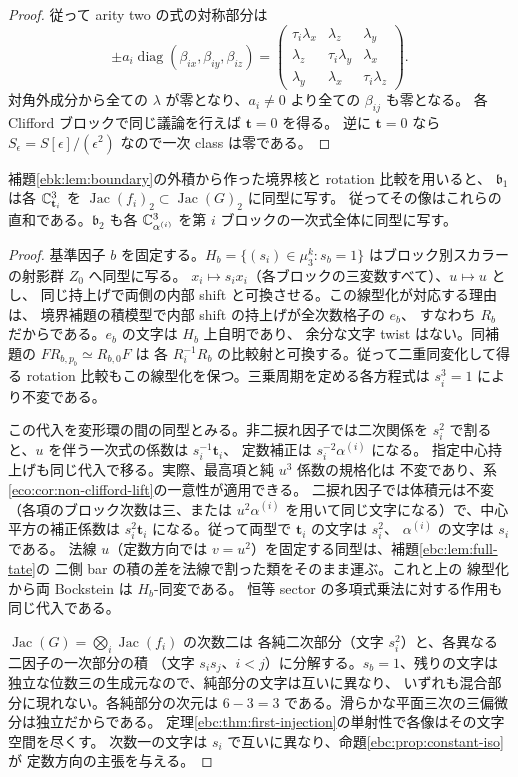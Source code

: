 \begin{proof}
従って arity two の式の対称部分は
\[
 \pm a_i\operatorname{diag}(\beta_{ix},\beta_{iy},\beta_{iz})
   =
 \begin{pmatrix}
 \tau_i\lambda_x&\lambda_z&\lambda_y\\
 \lambda_z&\tau_i\lambda_y&\lambda_x\\
 \lambda_y&\lambda_x&\tau_i\lambda_z
 \end{pmatrix}.
\]
対角外成分から全ての $\lambda$ が零となり、$a_i\ne0$ より全ての $\beta_{ij}$ も零となる。
各 Clifford ブロックで同じ議論を行えば $\mathbf t=0$ を得る。
逆に $\mathbf t=0$ なら $S_\epsilon=S[\epsilon]/(\epsilon^2)$ なので一次 class は零である。
\end{proof}

\begin{corollary}[固定楕円因子ごとの一次像]\label{ebc:cor:pure-image}
補題\ref{ebk:lem:boundary}の外積から作った境界核と rotation 比較を用いると、
$\mathfrak b_1$ は各 $\mathbb C^3_{\mathbf t_i}$ を
$\operatorname{Jac}(f_i)_2\subset\operatorname{Jac}(G)_2$ に同型に写す。
従ってその像はこれらの直和である。$\mathfrak b_2$ も各
$\mathbb C^3_{\alpha^{(i)}}$ を第 $i$ ブロックの一次式全体に同型に写す。
\end{corollary}
\begin{proof}
基準因子 $b$ を固定する。$H_b=\{(s_i)\in\mu_3^k:s_b=1\}$
はブロック別スカラーの射影群 $Z_0$ へ同型に写る。
$x_i\mapsto s_i x_i$（各ブロックの三変数すべて）、$u\mapsto u$ とし、
同じ持上げで両側の内部 shift と可換させる。この線型化が対応する理由は、
境界補題の積模型で内部 shift の持上げが全次数格子の $e_b$、
すなわち $R_b$ だからである。$e_b$ の文字は $H_b$ 上自明であり、
余分な文字 twist はない。同補題の $FR_{b,p_b}\simeq R_{b,0}F$ は
各 $R_i^{-1}R_b$ の比較射と可換する。従って二重同変化して得る
rotation 比較もこの線型化を保つ。三乗周期を定める各方程式は $s_i^3=1$ により不変である。

この代入を変形環の間の同型とみる。非二捩れ因子では二次関係を
$s_i^2$ で割ると、$u$ を伴う一次式の係数は $s_i^{-1}\mathbf t_i$、
定数補正は $s_i^{-2}\alpha^{(i)}$ になる。
指定中心持上げも同じ代入で移る。実際、最高項と純 $u^3$ 係数の規格化は
不変であり、系\ref{eco:cor:non-clifford-lift}の一意性が適用できる。
二捩れ因子では体積元は不変（各項のブロック次数は三、または
$u^2\alpha^{(i)}$ を用いて同じ文字になる）で、中心平方の補正係数は
$s_i^2\mathbf t_i$ になる。従って両型で $\mathbf t_i$ の文字は $s_i^2$、
$\alpha^{(i)}$ の文字は $s_i$ である。
法線 $u$（定数方向では $v=u^2$）を固定する同型は、補題\ref{ebc:lem:full-tate}の
二側 bar の積の差を法線で割った類をそのまま運ぶ。これと上の
線型化から両 Bockstein は $H_b$-同変である。
恒等 sector の多項式乗法に対する作用も同じ代入である。

$\operatorname{Jac}(G)=\bigotimes_i\operatorname{Jac}(f_i)$ の次数二は
各純二次部分（文字 $s_i^2$）と、各異なる二因子の一次部分の積
（文字 $s_i s_j$、$i<j$）に分解する。$s_b=1$、残りの文字は
独立な位数三の生成元なので、純部分の文字は互いに異なり、
いずれも混合部分に現れない。各純部分の次元は
$6-3=3$ である。滑らかな平面三次の三偏微分は独立だからである。
定理\ref{ebc:thm:first-injection}の単射性で各像はその文字空間を尽くす。
次数一の文字は $s_i$ で互いに異なり、命題\ref{ebc:prop:constant-iso}が
定数方向の主張を与える。
\end{proof}

